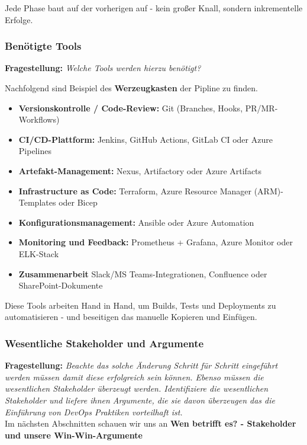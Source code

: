 Jede Phase baut auf der vorherigen auf - kein großer Knall, sondern inkrementelle Erfolge.

\subsubsection{Benötigte Tools}

\textbf{Fragestellung:} \textit{Welche Tools werden hierzu benötigt?}

Nachfolgend sind Beispiel des \textbf{Werzeugkasten} der Pipline zu finden.

\begin{itemize}
    \item \textbf{Versionskontrolle / Code-Review:} Git (Branches, Hooks, PR/MR-Workflows)
    \item \textbf{CI/CD-Plattform:} Jenkins, GitHub Actions, GitLab CI oder Azure Pipelines
    \item \textbf{Artefakt-Management:} Nexus, Artifactory oder Azure Artifacts
    \item \textbf{Infrastructure as Code:} Terraform, Azure Resource Manager (ARM)-Templates oder Bicep
    \item \textbf{Konfigurationsmanagement:} Ansible oder Azure Automation
    \item \textbf{Monitoring und Feedback:} Prometheus + Grafana, Azure Monitor oder ELK-Stack
    \item \textbf{Zusammenarbeit} Slack/MS Teams-Integrationen, Confluence oder SharePoint-Dokumente
\end{itemize}

Diese Tools arbeiten Hand in Hand, um Builds, Tests und Deployments zu automatisieren - und beseitigen das manuelle Kopieren und Einfügen.


\subsubsection{Wesentliche Stakeholder und Argumente}

\textbf{Fragestellung:} \textit{Beachte das solche Änderung Schritt für Schritt eingeführt werden müssen damit diese
erfolgreich sein können. Ebenso müssen die wesentlichen Stakeholder überzeugt werden.
Identifiziere die wesentlichen Stakeholder und liefere ihnen Argumente, die sie davon
überzeugen das die Einführung von DevOps Praktiken vorteilhaft ist.}
\\

Im nächsten Abschnitten schauen wir uns an \textbf{Wen betrifft es? - Stakeholder und unsere Win-Win-Argumente}

